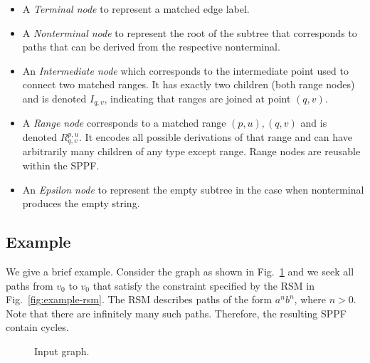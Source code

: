 \documentclass[
11pt,%
tightenlines,%
twoside,%
onecolumn,%
nobibnotes,%
nofootinbib,%
superscriptaddress,%
noshowpacs,%
longbibliography,%
centertags]%
{revtex4-2}
\begin{document}
\begin{itemize}
    \item A \textit{Terminal node} to represent a matched edge label.
    \item A \textit{Nonterminal node} to represent the root of the subtree that corresponds to paths that can be derived from the respective nonterminal.  
    \item An \textit{Intermediate node} which corresponds to the intermediate point used to connect two matched ranges. It has exactly two children (both range nodes) and is denoted $I_{q,v}$, indicating that ranges are joined at point $(q,v)$.
    \item A \textit{Range node} corresponds to a matched range $(p,u),(q,v)$ and is denoted $R^{p,u}_{q,v}$. It encodes all possible derivations of that range and can have arbitrarily many children of any type except range. Range nodes are reusable within the SPPF.
    \item An \textit{Epsilon node} to represent the empty subtree in the case when nonterminal produces the empty string. 
\end{itemize}

\subsection{Example}\label{section:example_of_rsm}

We give a brief example.
Consider the graph as shown in Fig.~\ref{fig:input-graph-1} and we seek all paths from $v_0$ to $v_0$ that satisfy the constraint specified by the RSM in Fig.~\ref{fig:example-rsm}.
The RSM describes paths of the form $a^n b^n$, where $n > 0$.
Note that there are infinitely many such paths. 
Therefore, the resulting SPPF contain cycles.

\begin{figure}
    \centering
    

    \caption{Input graph.}
    \label{fig:input-graph-1}

\end{figure}
\end{document}
